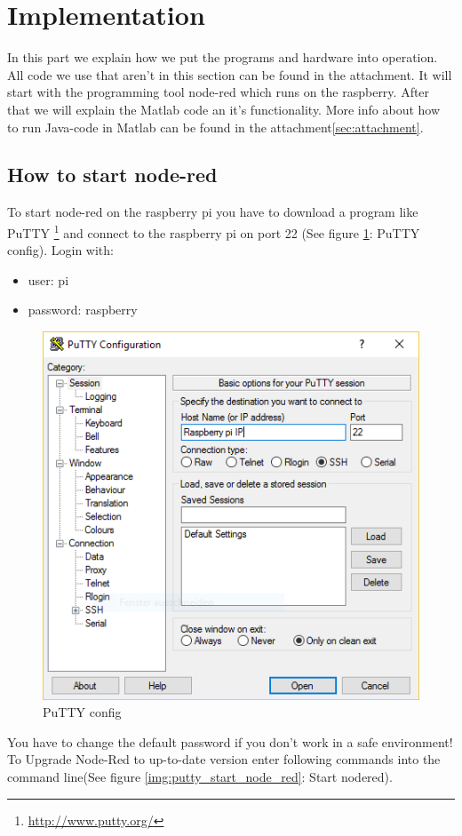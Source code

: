 \documentclass[12pt]{article}
\begin{document}
\newpage

\section{Implementation}
In this part we explain how we put the programs and hardware into operation. All code we use that aren't in this section can be found in the attachment. It will start with the programming tool node-red which runs on the raspberry. After that we will explain the Matlab code an it's functionality. More info about how to run Java-code in Matlab can be found in the attachment\ref{sec:attachment}.

\subsection{How to start node-red}\label{sec:how-to-start-node-red}
To start node-red on the raspberry pi you have to download a program like PuTTY 
\footnote{\url{http://www.putty.org/}} and connect to the raspberry pi on port 22
(See figure \ref{img:putty_conf}: PuTTY config). Login with:

\begin{itemize}
	\item user: pi
	\item password: raspberry
\end{itemize}

\begin{figure}[H]
	\includegraphics[width=0.5\linewidth]{putty_conf.png}
	\centering
	\caption{PuTTY config} 
	\label{img:putty_conf}	
\end{figure}
You have to change the default password if you don't work in a safe environment!\\
To Upgrade Node-Red to up-to-date version enter following commands into the command line(See figure \ref{img:putty_start_node_red}: Start nodered).
\end{document}
